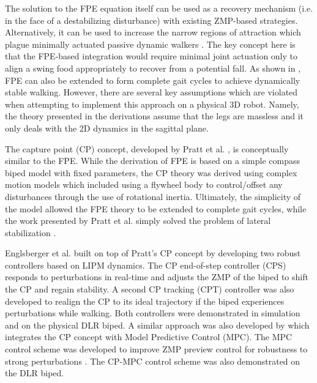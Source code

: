 The solution to the FPE equation itself can be used as a recovery mechanism (i.e. in the face of a destabilizing disturbance) with existing ZMP-based strategies. Alternatively, it can be used to increase the narrow regions of attraction which plague minimally actuated passive dynamic walkers \cite{Goswami:1996gn,Asano:2000wi,Kuo:1999tn}. The key concept here is that the FPE-based integration would require minimal joint actuation only to align a swing food appropriately to recover from a potential fall. As shown in \cite{Wight:2008ii,Wight:2008vt}, FPE can also be extended to form complete gait cycles to achieve dynamically stable walking. However, there are several key assumptions which are violated when attempting to implement this approach on a physical 3D robot. Namely, the theory presented in the derivations assume that the legs are massless and it only deals with the 2D dynamics in the sagittal plane.

The capture point (CP) concept, developed by Pratt et al. \cite{Pratt:2006vy}, is conceptually similar to the FPE. While the derivation of FPE is based on a simple compass biped model with fixed parameters, the CP theory was derived using complex motion models which included using a flywheel body to control/offset any disturbances through the use of rotational inertia. Ultimately, the simplicity of the model allowed the FPE theory to be extended to complete gait cycles, while the work presented by Pratt et al. simply solved the problem of lateral stabilization \cite{Wight:2008ii}.

Englsberger et al. built on top of Pratt's CP concept \cite{Englsberger:2011jx} by developing two robust controllers based on LIPM dynamics. The CP end-of-step controller (CPS) responds to perturbations in real-time and adjusts the ZMP of the biped to shift the CP and regain stability. A second CP tracking (CPT) controller was also developed to realign the CP to its ideal trajectory if the biped experiences perturbations while walking. Both controllers were demonstrated in simulation and on the physical DLR biped. A similar approach was also developed by \cite{Krause:2012vo} which integrates the CP concept with Model Predictive Control (MPC). The MPC control scheme was developed to improve ZMP preview control for robustness to strong perturbations \cite{Wieber2006}. The CP-MPC control scheme was also demonstrated on the DLR biped.

